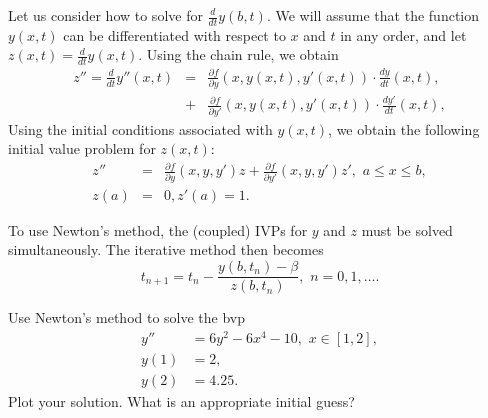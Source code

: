Let us consider how to solve for $\frac{d}{dt} y(b,t)$. We will assume that the function $y(x,t)$ can be differentiated with respect to $x$ and $t$ in any order, and let  $z(x,t) = \frac{d}{dt} y(x,t).$ Using the chain rule, we obtain 
\begin{eqnarray*}
z'' = \frac{d}{dt} y''(x,t) &=& \frac{\partial f}{\partial y} (x,y(x,t),y'(x,t)) \cdot \frac{dy}{dt}(x,t) ,\\
&+& \frac{\partial f}{\partial y'} (x,y(x,t),y'(x,t)) \cdot \frac{dy'}{dt}(x,t),
\end{eqnarray*}
Using the initial conditions associated with $y(x,t)$, we obtain the following initial value problem for $z(x,t)$: 
\begin{eqnarray*}
z'' &=& \frac{\partial f}{\partial y} (x,y,y') z + \frac{\partial f}{\partial y'} (x,y,y') z'
,\,\,a \leq x \leq b, \\
 z(a) &=& 0, z'(a) = 1.
\end{eqnarray*}

To use Newton's method, the (coupled) IVPs for $y$ and $z$ must be solved simultaneously. The iterative method then becomes 
\[
t_{n+1} = t_n - \frac{ y(b,t_n) - \beta}{z(b,t_n)}, \,\, n = 0,1,\hdots
.\]
% 
% 	
% 	
% 		
% 


\begin{problem}
Use Newton's method to solve the bvp
\begin{equation*}
\begin{split}
y'' &= 6y^2-6x^4-10, \,\, x \in [1,2],\\
y(1) &= 2, \\
y(2) &= 4.25.
\end{split}
\end{equation*}
Plot your solution. What is an appropriate initial guess? 
\end{problem}


